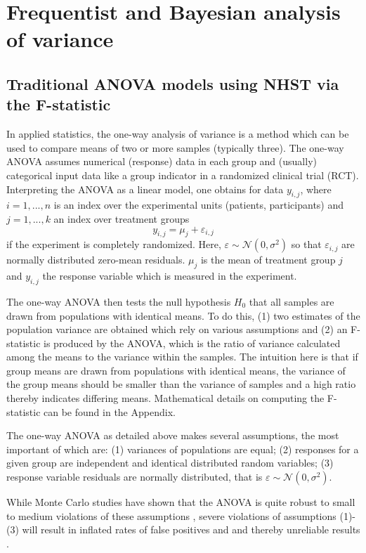 \section{Frequentist and Bayesian analysis of variance} \label{sec:anova}
\subsection{Traditional ANOVA models using NHST via the F-statistic}
In applied statistics, the one-way analysis of variance is a method which can be used to compare means of two or more samples (typically three). The one-way ANOVA assumes numerical (response) data in each group and (usually) categorical input data like a group indicator in a randomized clinical trial (RCT). Interpreting the ANOVA as a linear model, one obtains for data $y_{i,j}$, where $i=1,...,n$ is an index over the experimental units (patients, participants) and $j=1,...,k$ an index over treatment groups
\begin{equation} \label{eq:mean}
y_{i,j}=\mu_j+\varepsilon_{i,j}
\end{equation}
if the experiment is completely randomized. Here, $\varepsilon \sim \mathcal{N}(0,\sigma^2)$ so that $\varepsilon_{i,j}$ are normally distributed zero-mean residuals. $\mu_j$ is the mean of treatment group $j$ and $y_{i,j}$ the response variable which is measured in the experiment.

The one-way ANOVA then tests the null hypothesis $H_0$ that all samples are drawn from populations with identical means. To do this, (1) two estimates of the population variance are obtained which rely on various assumptions and (2) an F-statistic is produced by the ANOVA, which is the ratio of variance calculated among the means to the variance within the samples. The intuition here is that if group means are drawn from populations with identical means, the variance of the group means should be smaller than the variance of samples and a high ratio thereby indicates differing means. Mathematical details on computing the F-statistic can be found in the Appendix.

The one-way ANOVA as detailed above makes several assumptions, the most important of which are: (1) variances of populations are equal; (2) responses for a given group are independent and identical distributed random variables; (3) response variable residuals are normally distributed, that is $\varepsilon \sim \mathcal{N}(0,\sigma^2)$.

While Monte Carlo studies have shown that the ANOVA is quite robust to small to medium violations of these assumptions \citep{Donaldson1966}, severe violations of assumptions (1)-(3) will result in inflated rates of false positives and and thereby unreliable results \citep{Tiku1971}.

